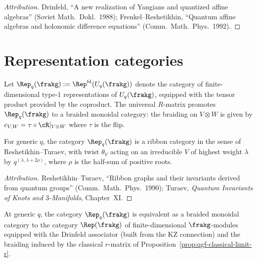 \begin{proof}[Attribution]
Drinfeld, ``A new realization of Yangians and quantized affine algebras'' (Soviet Math.\ Dokl.\ 1988); Frenkel--Reshetikhin, ``Quantum affine algebras and holonomic difference equations'' (Comm.\ Math.\ Phys.\ 1992).
\end{proof}

\section{Representation categories}
\label{sec:qgf-rep-categories}

Let $\Rep_q(\frakg) := \Rep^{\mathrm{fd}}(U_q(\frakg))$ denote the category of finite-dimensional type-$1$ representations of $U_q(\frakg)$, equipped with the tensor product provided by the coproduct. The universal $R$-matrix promotes $\Rep_q(\frakg)$ to a braided monoidal category: the braiding on $V \otimes W$ is given by $c_{V, W} = \tau \circ \cR|_{V \otimes W}$ where $\tau$ is the flip.

\begin{proposition}
\label{prop:qgf-ribbon}
For generic $q$, the category $\Rep_q(\frakg)$ is a ribbon category in the sense of Reshetikhin--Turaev, with twist $\theta_V$ acting on an irreducible $V$ of highest weight $\lambda$ by $q^{(\lambda, \lambda + 2\rho)}$, where $\rho$ is the half-sum of positive roots.
\end{proposition}

\begin{proof}[Attribution]
Reshetikhin--Turaev, ``Ribbon graphs and their invariants derived from quantum groups'' (Comm.\ Math.\ Phys.\ 1990); Turaev, \emph{Quantum Invariants of Knots and $3$-Manifolds}, Chapter~XI.
\end{proof}

\begin{proposition}
\label{prop:qgf-drinfeld-kohno}
At generic $q$, the category $\Rep_q(\frakg)$ is equivalent as a braided monoidal category to the category $\Rep(\frakg)$ of finite-dimensional $\frakg$-modules equipped with the Drinfeld associator (built from the KZ connection) and the braiding induced by the classical $r$-matrix of Proposition~\ref{prop:qgf-classical-limit-r}.
\end{proposition}

